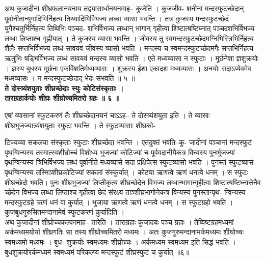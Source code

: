 \documentclass[11pt, openany]{book}
\begin{document}
{{{{\vspace{2mm}
\justifying
 अथ कुजादीनां शीघ्रफलानयनाय तद्व्यासार्धानयनमाह-- कुजेति ।
कुजजीव-
शनीनां मन्दस्फुटच्छेदान् पूर्वानीतान्युगादिभिर्निहत्य
तिथ्यादिभिर्विभज्य लब्धा 
व्यासा भवन्ति । तत्र कुजस्य मन्दस्फुटच्छेदं युगैश्चतुर्भिर्निहत्य
तिथिभिः पञ्चद-
शभिर्विभज्य लब्धान् भागान् गृहीत्वा शिष्टात्षष्टिघ्नात्
पञ्चदशभिर्विभज्य लब्धा 
लिप्ताश्च गृह्णीयात् । ते कुजस्य व्यासा भवन्ति । जीवस्य तु
स्वमन्दस्फुटच्छेदमग्निभिस्त्रिभिर्निहत्य शैलैः सप्तभिर्विभज्य लब्धं सावयवं जीवस्य
व्यासो 
भवति । मन्दस्य च स्वमन्दस्फुटच्छेदमगैः सप्तभिर्निहत्य ऋतुभिः
षड्भिर्विभज्य 
लब्धं सावयवं मन्दस्य व्यासो भवति । एते मध्यव्यासा न स्फुटाः ।
मूर्छनेशा 
ज्ञशुक्रयोः । ज्ञस्य बुधस्य मूर्छना एकविंशतिर्मध्यव्यासः । शुक्रस्य
ईशा एकादश 
मध्यव्यासः । अनयोः सदाऽप्येवमेव मध्मव्यासः । न मन्दस्फुटच्छेदाद्
भेदः 
संभवति ॥ ५ ॥ \\

\centering
\textbf{
 ते दोस्त्र्यंशयुताः शीघ्रच्छेदाः स्युः कोटिसंस्कृताः । \\
 ताराग्रहार्कयोः शीघ्रः शीघ्रोच्चमितरो ग्रहः ॥ ६ ॥ }

\vspace{2mm}
\justifying
 एषां व्यासानां स्फुटकरणं तैः शीघ्रच्छेदानयनं चाऽऽह-- ते
दोस्त्र्यंशयुता इति । 
ते व्यासाः शीघ्रभुजज्यात्र्यंशयुताः स्फुटा भवन्ति । ते स्फुटव्यासाः
शीघ्रको-

\newpage
\thispagestyle{fancy}
\fancyhf{}
\lhead{[प्रकीर्णकाधिकारः]}
\justifying
\noindent
टिज्यय्या सकलया संस्कृताः स्फुटाः शीघ्रच्छेदा भवन्ति । एतदुक्तं
भवति--कु-
जादीनां पञ्चानां मन्दस्फुटं पृथग्विन्यस्य तस्मात्स्वशीघ्रोच्चं विशोध्य
भुजज्यां
कोटिज्यां च पूर्ववदानीयैकत्र विन्यस्य पुनर्भुजज्यां पृथग्विन्यस्य
त्रिभिर्विभज्य
लब्धं पूर्वानीते मध्यव्यासे सदा प्रक्षिपेत्स स्फुटव्यासो भवति ।
पुनस्तं स्फुटव्यासं
पृथग्विन्यस्य तस्मिञ्शीघ्रकोटिज्यां सकलां संस्कुर्यात् । कोट्या
ऋणत्वे ऋणं
धनत्वे धनम् । स स्फुटः शीघ्रच्छेदो भवति। पुनः शीघ्रभुजज्यां
लिप्तीकृत्य
शीघ्रच्छेदेन विभज्य लब्धान्भागान्गृहीत्वा शिष्टात्षष्टिघ्नात्तेनैव
च्छेदेन विभज्य
लब्धा लिप्ताश्च गृहीत्वा छेदं संरक्ष्य ताञ्शीघ्रभागोनेकत्र विन्यस्य
पुनस्तान्पृथ-
ग्विन्यस्य मन्दस्फुटग्रहे ऋणं धनं वा कुर्यात् ।   भुजाया ऋणत्वे ऋणं
धनत्वे धनम् । 
स स्फुटग्रहो भवति । कुजबुधगुरुसितमन्दानामेवं स्फुटकरणं
कुर्यादिति ।\\
\indent
 अथ कुजादीनां शीघ्रोच्चकल्पनमाह-- तारेति । ताराग्रहाः कुजादयः
पञ्च
ग्रहाः । तेष्विष्टग्रहमध्यमां अर्कमध्यमयोर्या शीघ्रगतिः सा तस्य
शीघ्रोच्चमितरो
मध्यमः । अतः कुजगुरुमन्दानामर्कमध्यमः शीघोच्चः स्वमध्यमो मध्यमः ।
बुध-
शुक्रयोः स्वमध्यमः शीघ्रोच्चः । अर्कमध्यम स्वमध्यम इति सिद्धं भवति ।
बुधशुक्रयोरर्कमध्यमं स्वमध्यमं परिकल्प्य मन्दस्फुटं शीघ्रस्फुटं च
कुर्यात् ॥६॥

}}}}
\end{document}
